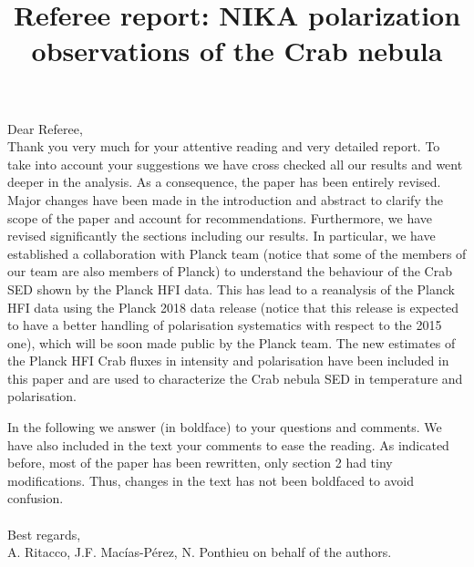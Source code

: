 \documentclass[12pt]{article}
\title{Referee report: NIKA polarization observations of the Crab nebula}
\begin{document}
\maketitle

\noindent Dear Referee,\\

Thank you very much for your attentive reading and very detailed report. 
To take into account your suggestions we have cross checked all our results
and went deeper in the analysis.
As a consequence, the paper has been entirely revised. Major changes have been made in the introduction and abstract to clarify the scope of the paper and account for
recommendations. Furthermore, we have revised significantly the sections including our results. In particular, we have established a collaboration with 
Planck team (notice that some of the members of our team are also members of Planck) to understand the behaviour of the Crab SED shown by the Planck HFI data. This has lead to a reanalysis of the Planck HFI data using the Planck 2018 data release (notice that this release is expected to have a better handling of polarisation systematics with respect to the 2015 one), which will be soon made public by the Planck team.  The new estimates of the Planck HFI Crab fluxes in intensity and polarisation have been included in this paper and are used to characterize
the Crab nebula SED in temperature and polarisation.

In the following we answer (in boldface) to your questions and comments. 
We have also included in the text your comments to ease the reading.
As indicated before, most of the paper has been rewritten, only section 2 had tiny modifications. Thus, changes in the text has not been boldfaced to avoid confusion. \\  \\
Best regards,\\
A. Ritacco, J.F. Macías-Pérez, N. Ponthieu on behalf of the authors.
\end{document}
